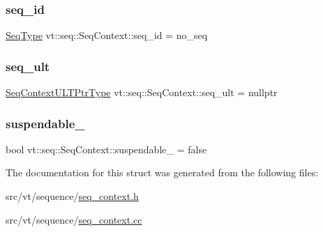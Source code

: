 \subsubsection{\texorpdfstring{seq\+\_\+id}{seq\_id}}
{\footnotesize\ttfamily \hyperlink{namespacevt_1_1seq_a3b612da217ac669d39c159f134ab8434}{Seq\+Type} vt\+::seq\+::\+Seq\+Context\+::seq\+\_\+id = no\+\_\+seq\hspace{0.3cm}{\ttfamily [private]}}

\mbox{\label{structvt_1_1seq_1_1_seq_context_a8b90e0946bbef6e744a1030699b047ef}} 
\subsubsection{\texorpdfstring{seq\+\_\+ult}{seq\_ult}}
{\footnotesize\ttfamily \hyperlink{structvt_1_1seq_1_1_seq_context_a7e5dc3958df8473c5bcd938f0f2cf933}{Seq\+Context\+U\+L\+T\+Ptr\+Type} vt\+::seq\+::\+Seq\+Context\+::seq\+\_\+ult = nullptr}

\mbox{\label{structvt_1_1seq_1_1_seq_context_ab540af3ff9d1a7fa6545f7bbaa5c498f}} 
\subsubsection{\texorpdfstring{suspendable\+\_\+}{suspendable\_}}
{\footnotesize\ttfamily bool vt\+::seq\+::\+Seq\+Context\+::suspendable\+\_\+ = false\hspace{0.3cm}{\ttfamily [private]}}



The documentation for this struct was generated from the following files\+:\begin{DoxyCompactItemize}
\item 
src/vt/sequence/\hyperlink{seq__context_8h}{seq\+\_\+context.\+h}\item 
src/vt/sequence/\hyperlink{seq__context_8cc}{seq\+\_\+context.\+cc}\end{DoxyCompactItemize}
